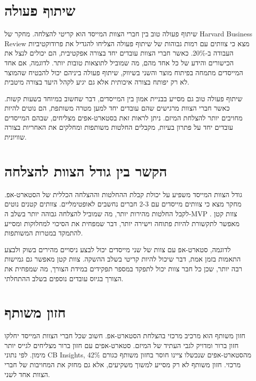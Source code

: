 \section{שיתוף פעולה}

שיתוף פעולה טוב בין חברי הצוות המייסד הוא קריטי להצלחה. מחקר של Harvard Business Review מצא כי צוותים עם רמות גבוהות של שיתוף פעולה הצליחו להגדיל את פרודוקטיביות העבודה ב-20\%. כאשר חברי הצוות עובדים יחד בצורה אפקטיבית, הם יכולים לנצל את הכישורים והידע של כל אחד מהם, מה שמוביל לתוצאות טובות יותר. לדוגמה, אם אחד המייסדים מתמחה בפיתוח מוצר והשני בשיווק, שיתוף פעולה ביניהם יכול להבטיח שהמוצר לא רק יפותח בצורה איכותית אלא גם יגיע לקהל היעד בצורה מיטבית.

שיתוף פעולה טוב גם מסייע בבניית אמון בין המייסדים, דבר שחשוב במיוחד בשעות קשות. כאשר חברי הצוות מרגישים שהם עובדים יחד למען מטרה משותפת, הם נוטים להיות מחויבים יותר להצלחת המיזם. ניתן לראות זאת בסטארט-אפים מצליחים, שבהם המייסדים עובדים יחד על פתרון בעיות, מקבלים החלטות משותפות ומחלקים את האחריות בצורה שוויונית.

\section{הקשר בין גודל הצוות להצלחה}

גודל הצוות המייסד משפיע על יכולת קבלת ההחלטות וההצלחה הכללית של הסטארט-אפ. מחקר מצא כי צוותים מייסדים עם 2-3 חברים נחשבים לאופטימליים. צוותים קטנים נוטים לקבל החלטות מהירות יותר, מה שמוביל להצלחה גבוהה יותר בשלב ה-MVP . צוות קטן מאפשר לתקשורת להיות פתוחה וישירה יותר, דבר שמפחית את הסיכוי למחלוקות ומסייע להתמקד במטרות המשותפות.

לדוגמה, סטארט-אפ עם צוות של שני מייסדים יכול לבצע ניסויים מהירים בשוק ולבצע התאמות בזמן אמת, דבר שיכול להיות קריטי בשלב ההשקה. צוות קטן מאפשר גם גמישות רבה יותר, שכן כל חבר צוות יכול לתפקד במספר תפקידים במידת הצורך, מה שמפחית את הצורך בגיוס עובדים נוספים בשלב ההתחלתי.

\section{חזון משותף}

חזון משותף הוא מרכיב מרכזי בהצלחת הסטארט-אפ. חשוב שכל חברי הצוות המייסד יחלקו חזון ברור ומדויק לגבי העתיד של המיזם. סטארט-אפים עם חזון ברור מצליחים לגייס יותר מימון. לפי נתוני CB Insights, 42\% מהסטארט-אפים שנכשלו ציינו חוסר בחזון משותף כגורם מרכזי. חזון משותף לא רק מסייע למשוך משקיעים, אלא גם מחזק את המחויבות של חברי הצוות אחד לשני.

